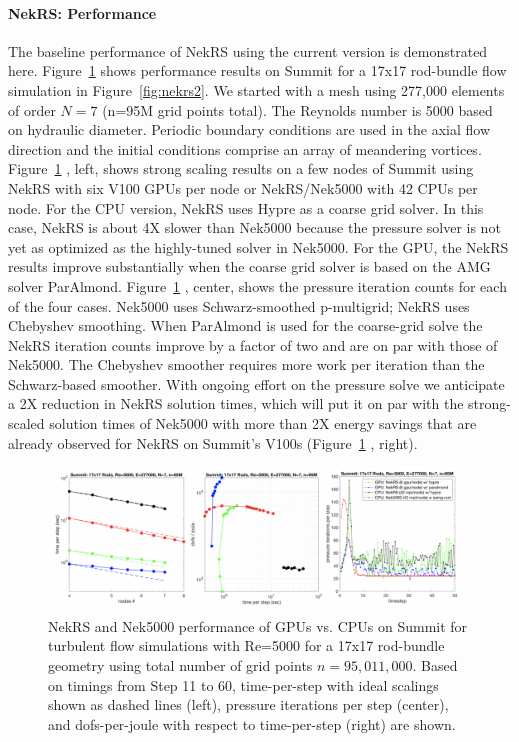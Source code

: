 \paragraph{NekRS: Performance} The baseline performance of NekRS using the current version \cite{tomov2019ecp} is demonstrated here. Figure~\ref{fig:nekrs1} shows performance results on Summit for a 17x17 rod-bundle flow simulation in Figure~\ref{fig:nekrs2}. We started with a mesh using 277,000 elements of order $N=7$ (n=95M grid points total). The Reynolds number is 5000 based on hydraulic diameter. Periodic boundary conditions are used in the axial flow direction and the initial conditions comprise an array of meandering vortices.  Figure~\ref{fig:nekrs1} , left, shows strong scaling results on a few nodes of Summit using NekRS with six V100 GPUs per node or NekRS/Nek5000 with 42 CPUs per node. For the CPU version, NekRS uses Hypre as a coarse grid solver. In this case, NekRS is about 4X slower than Nek5000 because the pressure solver is not yet as optimized as the highly-tuned solver in Nek5000. For the GPU, the NekRS results improve substantially when the coarse grid solver is based on the AMG solver ParAlmond.  Figure~\ref{fig:nekrs1} , center, shows the pressure iteration counts for each of the four cases. Nek5000 uses Schwarz-smoothed p-multigrid; NekRS uses Chebyshev smoothing. When ParAlmond is used for the coarse-grid solve the NekRS iteration counts improve by a factor of two and are on par with those of Nek5000. The Chebyshev smoother requires more work per iteration than the Schwarz-based smoother.  With ongoing effort on the pressure solve we anticipate a 2X reduction in NekRS solution times, which will put it on par with the strong-scaled solution times of Nek5000 with more than 2X energy savings that are already observed for NekRS on Summit's V100s (Figure~\ref{fig:nekrs1} , right).

\begin{figure}[h]
\centering
\includegraphics[width=\textwidth]{../figures/performance_nekrs}
\caption{ NekRS and Nek5000 performance of GPUs vs. CPUs on Summit for turbulent flow simulations with Re=5000 for a 17x17 rod-bundle geometry using total number of grid points $n=95,011,000$. Based on timings from Step 11 to 60, time-per-step with ideal scalings shown as dashed lines (left), pressure iterations per step (center), and dofs-per-joule with respect to time-per-step (right) are shown.}
\label{fig:nekrs1}
\end{figure}

